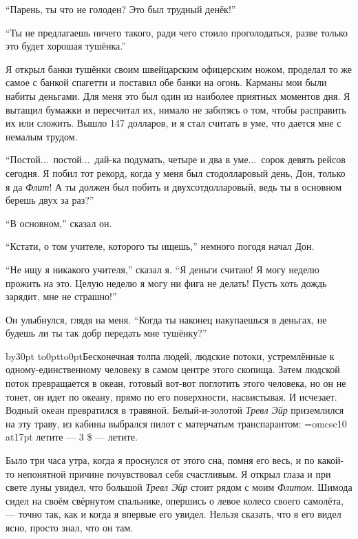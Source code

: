 ``Парень, ты что не голоден? Это был трудный денёк!''

``Ты не предлагаешь ничего такого, ради чего стоило проголодаться, разве только это будет хорошая
 тушёнка.''

Я открыл банки тушёнки своим швейцарским офицерским ножом, проделал то же самое с банкой спагетти и поставил обе банки на огонь. Карманы мои были набиты деньгами. Для меня это был один из наиболее приятных моментов дня. Я вытащил бумажки и пересчитал их, нимало не заботясь о том, чтобы расправить их или сложить. Вышло 147 долларов, и я стал считать в уме, что дается мне с немалым трудом.

``Постой...\ постой...\ дай-ка подумать, четыре и два в уме...\ сорок девять рейсов сегодня.
Я побил тот рекорд, когда у меня был стодолларовый день, Дон, только я да {\it Флит\/}!
А ты должен был побить и двухсотдолларовый, ведь ты в основном берешь двух за раз?''

``В основном,'' сказал он.

``Кстати, о том учителе, которого ты ищешь,'' немного погодя начал Дон.

``Не ищу я никакого учителя,'' сказал я. ``Я деньги считаю! Я могу неделю прожить на это. Целую
 неделю я могу ни фига не делать! Пусть хоть дождь зарядит, мне не страшно!''

Он улыбнулся, глядя на меня.
``Когда ты наконец накупаешься в деньгах, не будешь ли ты так добр передать мне тушёнку?''

\vfil\eject

{}
\vskip3cm

\begingroup
\def\par{\endgraf\endgroup}
\advance\parindent by30pt \hang{}
\noindent\vtop to0pt{\kern-8pt\hbox to0pt{\hss\kern\parindent\bukvfont Б\kern3pt}\vss}есконечная
толпа людей, людские потоки, устремлённые к од\-но\-му-един\-ствен\-но\-му человеку в самом центре этого
скопища. Затем людской поток превращается в океан, готовый вот-вот поглотить этого человека, но
он не тонет, он идет по океану, прямо по его поверхности, насвистывая. И исчезает. Водный океан
превратился в травяной. Белый-и-золотой {\it Тревл Эйр\/} приземлился на эту траву, из кабины выбрался
пилот с матерчатым транспарантом: {\font\csc=omcsc10 at17pt \csc летите --- 3 \$ --- летите}.

Было три часа утра, когда я проснулся от этого сна, помня его весь, и по какой-то непонятной
причине почувствовал себя счастливым. Я открыл глаза и при свете луны увидел, что большой
{\it Тревл Эйр\/} стоит рядом с моим {\it Флитом}. Шимода сидел на своём свёрнутом спальнике, опершись о левое колесо своего самолёта, --- точно так, как и когда я впервые его увидел. Нельзя сказать, что я его видел ясно, просто знал, что он там.

